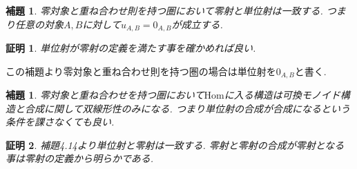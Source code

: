 \documentclass[a4paper,12pt]{ltjsarticle}
\theoremstyle{break}
\newtheorem{lem}[thm]{補題}
\newtheorem*{prf}{証明}
\newcommand{\Hom}{\mathrm{Hom}}
\numberwithin{equation}{section}
\begin{document}
\begin{lem}
  零対象と重ね合わせ則を持つ圏において零射と単位射は一致する. 
  つまり任意の対象$A,B$に対して$u_{A,B}=0_{A,B}$が成立する. 
\end{lem}

\begin{prf}
  単位射が零射の定義を満たす事を確かめれば良い. 
\end{prf}

この補題より零対象と重ね合わせ則を持つ圏の場合は単位射を$0_{A,B}$と書く. 

\begin{lem}
  零対象と重ね合わせを持つ圏において$\Hom$に入る構造は可換モノイド構造と合成に関して双線形性のみになる. 
  つまり単位射の合成が合成になるという条件を課さなくても良い. 
\end{lem}  

\begin{prf}
  補題4.14より単位射と零射は一致する. 
  零射と零射の合成が零射となる事は零射の定義から明らかである. 
\end{prf}
\end{document}
